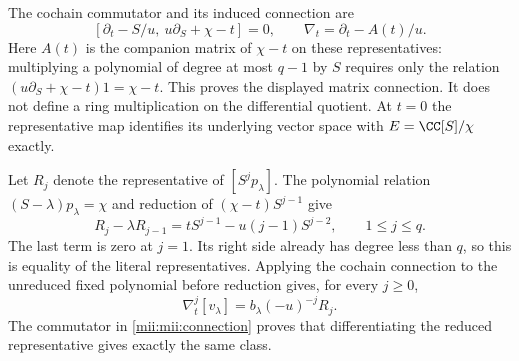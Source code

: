 The cochain commutator and its induced connection are
\begin{equation}\tag{MII16}\label{mii:mii:connection}
 [\partial_t-S/u,\ u\partial_S+\chi-t]=0,
 \qquad\nabla_t=\partial_t-A(t)/u.
\end{equation}
Here $A(t)$ is the companion matrix of $\chi-t$ on these
representatives: multiplying a polynomial of degree at most $q-1$
by $S$ requires only the relation
$(u\partial_S+\chi-t)1=\chi-t$. This proves the displayed matrix
connection. It does not define a ring multiplication on the
differential quotient. At $t=0$ the representative map identifies
its underlying vector space with $E=\CC[S]/\chi$ exactly.

Let $R_j$ denote the representative of $[S^j p_\lambda]$. The
polynomial relation $(S-\lambda)p_\lambda=\chi$ and reduction of
$(\chi-t)S^{j-1}$ give
\begin{equation}\tag{MII17}\label{mii:mii:recurrence}
 R_j-\lambda R_{j-1}
       =t S^{j-1}-u(j-1)S^{j-2},\qquad 1\le j\le q.
\end{equation}
The last term is zero at $j=1$. Its right side already has degree
less than $q$, so this is equality of the literal representatives.
Applying the cochain connection to the unreduced fixed polynomial
before reduction gives, for every $j\ge0$,
\begin{equation}\tag{MII18}\label{mii:mii:jets}
 \nabla_t^j[v_\lambda]=b_\lambda(-u)^{-j}R_j.
\end{equation}
The commutator in \eqref{mii:mii:connection} proves that differentiating
the reduced representative gives exactly the same class.

